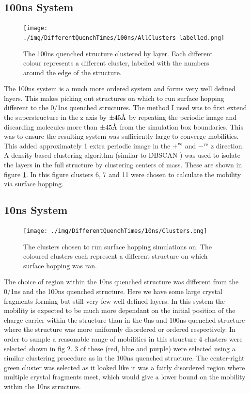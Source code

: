 \subsection{100ns System}
\begin{figure}[ht]
	\centering
	\texttt{[image: ./img/DifferentQuenchTimes/100ns/AllClusters\_labelled.png]}
	\caption{\label{fig:100nsClusteredLabelled}The 100ns quenched structure clustered by layer. Each different colour represents a different cluster, labelled with the numbers around the edge of the structure.}
\end{figure}
The 100ns system is a much more ordered system and forms very well defined layers. This makes picking out structures on which to run surface hopping different to the 0/1ns quenched structures. The method I used was to first extend the superstructure in the z axis by $\pm45 \text{\normalfont\AA}$ by repeating the periodic image and discarding molecules more than $\pm45 \text{\normalfont\AA}$ from the simulation box boundaries. This was to ensure the resulting system was sufficiently large to converge mobilities. This added approximately 1 extra periodic image in the $+^{\text{ve}}$ and $-^{\text{ve}}$ z direction. A density based clustering algorithm (similar to DBSCAN \cite{DBSCAN}) was used to isolate the layers in the full structure by clustering centers of mass. These are shown in figure \ref{fig:100nsClusteredLabelled}. In this figure clusters 6, 7 and 11 were chosen to calculate the mobility via surface hopping.
\clearpage

\subsection{10ns System}
\begin{figure}
	\texttt{[image: ./img/DifferentQuenchTimes/10ns/Clusters.png]}
	\caption{\label{fig:10nsClusters}The clusters chosen to run surface hopping simulations on. The coloured clusters each represent a different structure on which surface hopping was ran.}
\end{figure}
The choice of region within the 10ns quenched structure was different from the 0/1ns and the 100ns quenched structure. Here we have some large crystal fragments forming but still very few well defined layers. In this system the mobility is expected to be much more dependant on the initial position of the charge carrier within the structure than in the 0ns and 100ns quenched structure where the structure was more uniformly disordered or ordered respectively. In order to sample a reasonable range of mobilities in this structure 4 clusters were selected shown in fig \ref{fig:10nsClusters}. 3 of these (red, blue and purple) were selected using a similar clustering procedure as in the 100ns quenched structure. The center-right green cluster was selected as it looked like it was a fairly disordered region where multiple crystal fragments meet, which would give a lower bound on the mobility within the 10ns structure.

